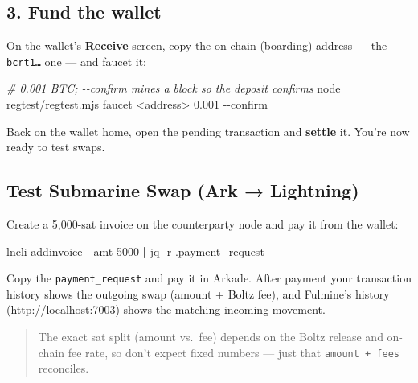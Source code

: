 \documentclass[
]{article}
\newenvironment{Shaded}{}{}
\newcommand{\AttributeTok}[1]{\textcolor[rgb]{0.49,0.56,0.16}{#1}}
\newcommand{\CommentTok}[1]{\textcolor[rgb]{0.38,0.63,0.69}{\textit{#1}}}
\newcommand{\ExtensionTok}[1]{#1}
\newcommand{\KeywordTok}[1]{\textcolor[rgb]{0.00,0.44,0.13}{\textbf{#1}}}
\newcommand{\NormalTok}[1]{#1}
\newcommand{\OperatorTok}[1]{\textcolor[rgb]{0.40,0.40,0.40}{#1}}
\begin{document}
\hypertarget{fund-the-wallet}{%
\subsection{3. Fund the wallet}\label{fund-the-wallet}}

On the wallet's \textbf{Receive} screen, copy the on-chain (boarding)
address --- the \texttt{bcrt1…} one --- and faucet it:

\begin{Shaded}
\begin{Highlighting}[]
\CommentTok{\# 0.001 BTC; {-}{-}confirm mines a block so the deposit confirms}
\ExtensionTok{node}\NormalTok{ regtest/regtest.mjs faucet }\OperatorTok{\textless{}}\NormalTok{address}\OperatorTok{\textgreater{}}\NormalTok{ 0.001 }\AttributeTok{{-}{-}confirm}
\end{Highlighting}
\end{Shaded}

Back on the wallet home, open the pending transaction and
\textbf{settle} it. You're now ready to test swaps.

\hypertarget{test-submarine-swap-ark-lightning}{%
\subsection{Test Submarine Swap (Ark →
Lightning)}\label{test-submarine-swap-ark-lightning}}

Create a 5,000-sat invoice on the counterparty node and pay it from the
wallet:

\begin{Shaded}
\begin{Highlighting}[]
\ExtensionTok{lncli}\NormalTok{ addinvoice }\AttributeTok{{-}{-}amt}\NormalTok{ 5000 }\KeywordTok{|} \ExtensionTok{jq} \AttributeTok{{-}r}\NormalTok{ .payment\_request}
\end{Highlighting}
\end{Shaded}

Copy the \texttt{payment\_request} and pay it in Arkade. After payment
your transaction history shows the outgoing swap (amount + Boltz fee),
and Fulmine's history (\url{http://localhost:7003}) shows the matching
incoming movement.

\begin{quote}
The exact sat split (amount vs.~fee) depends on the Boltz release and
on-chain fee rate, so don't expect fixed numbers --- just that
\texttt{amount\ +\ fees} reconciles.
\end{quote}
\end{document}
